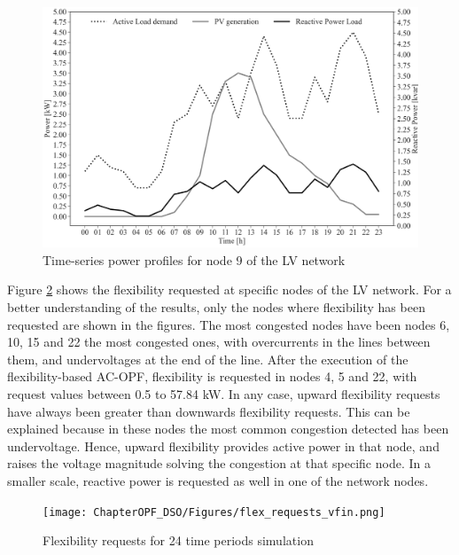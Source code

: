 \begin{figure}[H]
	\centering
	\includegraphics[width=0.8\columnwidth ]{ChapterOPF_DSO/Figures/p_q_profile_2.png}
		\caption{Time-series power profiles for node 9 of the LV network}
	\label{fig:data_opf_multiperiod}  
\end{figure}

Figure \ref{fig:flex_requests} shows the flexibility requested at specific nodes of the LV network. For a better understanding of the results, only the nodes where flexibility has been requested are shown in the figures. The most congested nodes have been nodes 6, 10, 15 and 22 the most congested ones, with overcurrents in the lines between them, and undervoltages at the end of the line. After the execution of the flexibility-based AC-OPF, flexibility is requested in nodes 4, 5 and 22, with request values between 0.5 to 57.84 kW. In any case, upward flexibility requests have always been greater than downwards flexibility requests. This can be explained because in these nodes the most common congestion detected has been undervoltage. Hence, upward flexibility provides active power in that node, and raises the voltage magnitude solving the congestion at that specific node. In a smaller scale, reactive power is requested as well in one of the network nodes. 

\begin{figure}[htbp]
	\centering
	\texttt{[image: ChapterOPF\_DSO/Figures/flex\_requests\_vfin.png]}
	\caption{Flexibility requests for 24 time periods simulation}
	\label{fig:flex_requests}  
\end{figure}

